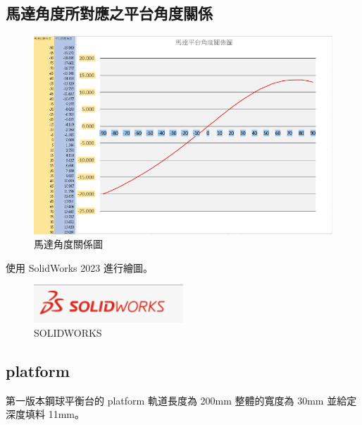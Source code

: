 \subsection{馬達角度所對應之平台角度關係}

\begin{figure}[htbp]
    \centering
    \includegraphics[width=1\textwidth]{./../images/6-1-50}
    \caption{馬達角度關係圖}
\end{figure}

\newpage

使用 SolidWorks 2023 進行繪圖。
\begin{figure}[htbp]
    \centering
    \includegraphics[width=0.5\textwidth]{./../images/6-1-1}
    \caption{SOLIDWORKS}
\end{figure}

\subsection{platform}

第一版本鋼球平衡台的 platform 軌道長度為 200mm 整體的寬度為 30mm 並給定深度填料 11mm。

